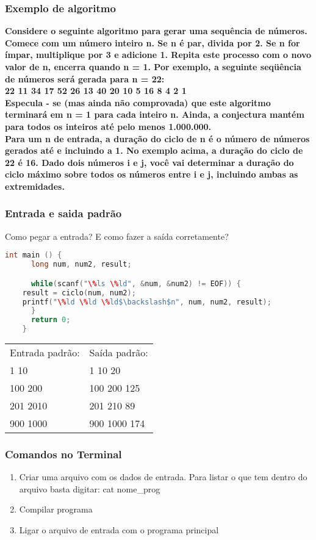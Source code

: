 \begin{frame}
  \frametitle{Exemplo de algoritmo}
  \textbf{\small Considere o seguinte algoritmo para gerar uma sequência de números. Comece com um número inteiro n. Se n é par, divida por 2. Se n for ímpar, multiplique por 3 e adicione 1. Repita este processo com o novo valor de n, encerra quando n = 1. Por exemplo, a seguinte seqüência de números será gerada para n = 22:\\22 11 34 17 52 26 13 40 20 10 5 16 8 4 2 1\\}
  \textbf{\small Especula - se (mas ainda não comprovada) que este algoritmo terminará em n = 1 para cada inteiro n. Ainda, a conjectura mantém para todos os inteiros até pelo menos 1.000.000.\\Para um n de entrada, a duração do ciclo de n é o número de números gerados até e incluindo a 1. No exemplo acima, a duração do ciclo de 22 é 16. Dado dois números i e j, você vai determinar a duração do ciclo máximo sobre todos os números entre i e j, incluindo ambas as extremidades.}
\end{frame}

\begin{frame}[fragile]
  \frametitle{Entrada e saida padrão}
  Como pegar a entrada? E como fazer a saída corretamente?
  \begin{lstlisting}[language=c]
    int main () {
      long num, num2, result;

      while(scanf("\%ls \%ld", &num, &num2) != EOF)) {
	result = ciclo(num, num2);
	printf("\%ld \%ld \%ld$\backslash$n", num, num2, result); 
      }
      return 0;
    }
  \end{lstlisting}
  \begin{tabular}{ll}\\
    Entrada padrão: &Saída padrão:\\
    1 10 &1 10 20\\
    100 200 &100 200 125\\
    201 2010 &201 210 89\\
    900 1000 &900 1000 174\\	
  \end{tabular}
\end{frame}

\begin{frame}
  \frametitle{Comandos no Terminal}
  \begin{enumerate}
    \item Criar uma arquivo com os dados de entrada. Para listar o que tem dentro do arquivo basta digitar: cat nome\_prog
    \item Compilar programa
    \item Ligar o arquivo de entrada com o programa principal
  \end{enumerate}
\end{frame}